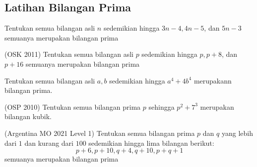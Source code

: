 \documentclass[11pt]{scrartcl}
\begin{document}
\subsection{Latihan Bilangan Prima}
\begin{problem}
    Tentukan semua bilangan asli $n$ sedemikian hingga $3n - 4, 4n - 5$, dan $5n - 3$ semuanya merupakan bilangan prima
\end{problem}

\begin{problem}
    (OSK 2011) Tentukan semua bilangan asli $p$ sedemikian hingga $p, p + 8$, dan $p + 16$ semuanya merupakan bilangan prima
\end{problem}

\begin{problem}
    Tentukan semua bilangan asli $a, b$ sedemikian hingga $a^4 + 4b^4$ merupakann bilangan prima.
\end{problem}

\begin{problem}
    (OSP 2010) Tentukan semua bilangan prima $p$ sehingga $p^2 + 7^3$ merupakan bilangan kubik.
\end{problem}

\begin{problem}
    (Argentina MO 2021 Level 1) Tentukan semua bilangan prima $p$ dan $q$ yang lebih dari $1$ dan kurang dari $100$ sedemikian hingga lima bilangan berikut: $$p + 6, p + 10, q + 4, q + 10, p + q + 1$$ semuanya merupakan bilangan prima
\end{problem}

\end{document}
